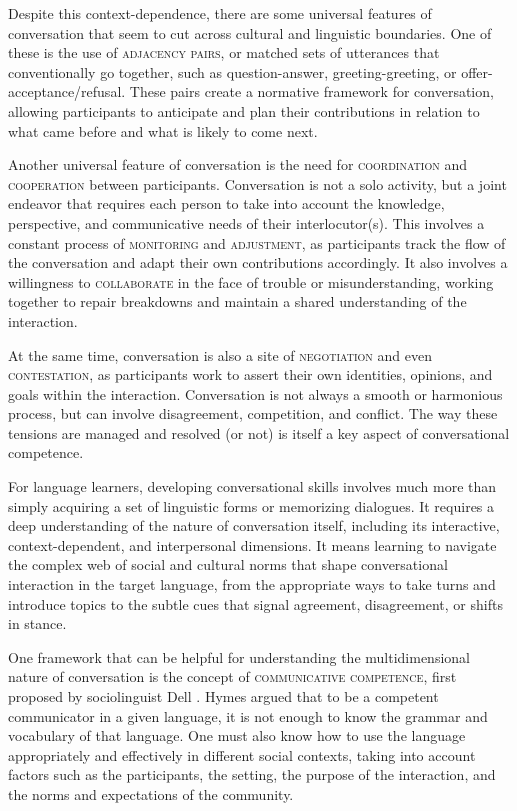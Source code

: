 Despite this context-dependence, there are some universal features of conversation that seem to cut across cultural and linguistic boundaries. One of these is the use of \textsc{adjacency pairs}, or matched sets of utterances that conventionally go together, such as question-answer, greeting-greeting, or offer-acceptance/refusal. These pairs create a normative framework for conversation, allowing participants to anticipate and plan their contributions in relation to what came before and what is likely to come next.

Another universal feature of conversation is the need for \textsc{coordination} and \textsc{cooperation} between participants. Conversation is not a solo activity, but a joint endeavor that requires each person to take into account the knowledge, perspective, and communicative needs of their interlocutor(s). This involves a constant process of \textsc{monitoring} and \textsc{adjustment}, as participants track the flow of the conversation and adapt their own contributions accordingly. It also involves a willingness to \textsc{collaborate} in the face of trouble or misunderstanding, working together to repair breakdowns and maintain a shared understanding of the interaction.

At the same time, conversation is also a site of \textsc{negotiation} and even \textsc{contestation}, as participants work to assert their own identities, opinions, and goals within the interaction. Conversation is not always a smooth or harmonious process, but can involve disagreement, competition, and conflict. The way these tensions are managed and resolved (or not) is itself a key aspect of conversational competence.

For language learners, developing conversational skills involves much more than simply acquiring a set of linguistic forms or memorizing dialogues. It requires a deep understanding of the nature of conversation itself, including its interactive, context-dependent, and interpersonal dimensions. It means learning to navigate the complex web of social and cultural norms that shape conversational interaction in the target language, from the appropriate ways to take turns and introduce topics to the subtle cues that signal agreement, disagreement, or shifts in stance.

One framework that can be helpful for understanding the multidimensional nature of conversation is the concept of \textsc{communicative competence}, first proposed by sociolinguist Dell \citet{hymes1972}. Hymes argued that to be a competent communicator in a given language, it is not enough to know the grammar and vocabulary of that language. One must also know how to use the language appropriately and effectively in different social contexts, taking into account factors such as the participants, the setting, the purpose of the interaction, and the norms and expectations of the community.

